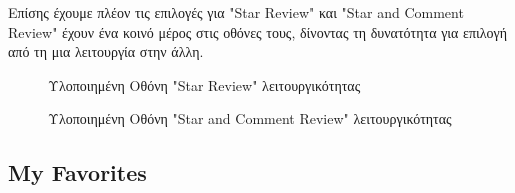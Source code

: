 \documentclass[12pt,a4paper]{article}
\begin{document}
Επίσης έχουμε πλέον τις επιλογές για "Star Review" και "Star and Comment Review" έχουν ένα κοινό μέρος στις οθόνες τους, δίνοντας τη δυνατότητα για επιλογή από τη μια λειτουργία στην άλλη.

\begin{figure}[H]
	\caption{Υλοποιημένη Οθόνη "Star Review" λειτουργικότητας}
	\label{Υλοποιημένη Οθόνη "Star Review" λειτουργικότητας}
\end{figure}

\begin{figure}[H]
	\caption{Υλοποιημένη Οθόνη "Star and Comment Review" λειτουργικότητας}
	\label{Υλοποιημένη Οθόνη "Star and Comment Review" λειτουργικότητας}
\end{figure}

\subsection{My Favorites}
\end{document}
